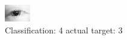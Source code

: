 \begin{figure}[h!]
\begin{center}
\includegraphics[width=0.60\columnwidth]{figures/ID32_class_4_target_3.png}
\end{center}
\caption{ Classification: 4 actual target: 3}
\label{fig:ID32_class_4_target_3}
\end{figure}
